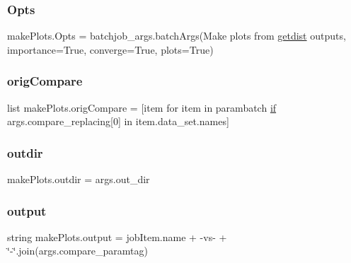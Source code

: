 \mbox{\label{namespacemakePlots_aadd603ab7f6d24d6997092505872a796}} 
\subsubsection{\texorpdfstring{Opts}{Opts}}
{\footnotesize\ttfamily make\+Plots.\+Opts = batchjob\+\_\+args.\+batch\+Args(\textquotesingle{}Make plots from \mbox{\hyperlink{GetDist_8f90_a78c185cfd3ac27937ede022b24ae72e9}{getdist}} outputs\textquotesingle{}, importance=True, converge=True, plots=True)}

\mbox{\label{namespacemakePlots_a88ed9851e2e4079a4ce7452fd12531bc}} 
\subsubsection{\texorpdfstring{orig\+Compare}{origCompare}}
{\footnotesize\ttfamily list make\+Plots.\+orig\+Compare = \mbox{[}item for item in parambatch \mbox{\hyperlink{plotTT_8m_a722e57dd98d67aec0b3589ce8efff8bb}{if}} args.\+compare\+\_\+replacing\mbox{[}0\mbox{]} in item.\+data\+\_\+set.\+names\mbox{]}}

\mbox{\label{namespacemakePlots_aa6a6744b257462647c396e09d585774e}} 
\subsubsection{\texorpdfstring{outdir}{outdir}}
{\footnotesize\ttfamily make\+Plots.\+outdir = args.\+out\+\_\+dir}

\mbox{\label{namespacemakePlots_a3c9805983858c38e3997774e1573274a}} 
\subsubsection{\texorpdfstring{output}{output}}
{\footnotesize\ttfamily string make\+Plots.\+output = job\+Item.\+name + \textquotesingle{}-\/vs-\/\textquotesingle{} + \char`\"{}-\/\char`\"{}.join(args.\+compare\+\_\+paramtag)}

